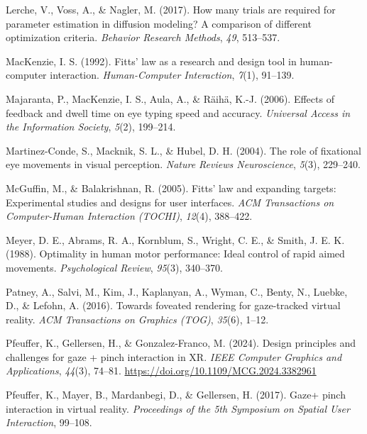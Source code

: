 \documentclass[
  11pt,
  11pt,
  letterpaper]{article}
\newlength{\cslhangindent}
\newenvironment{CSLReferences}[2] %
 {\begin{list}{}{%
  \setlength{\itemindent}{0pt}
  \setlength{\leftmargin}{0pt}
  \setlength{\parsep}{0pt}
  \ifodd #1
   \setlength{\leftmargin}{\cslhangindent}
   \setlength{\itemindent}{-1\cslhangindent}
  \fi
  \setlength{\itemsep}{#2\baselineskip}}}
 {\end{list}}
\begin{document}
\begin{CSLReferences}{1}{0}
Lerche, V., Voss, A., \& Nagler, M. (2017). How many trials are required
for parameter estimation in diffusion modeling? A comparison of
different optimization criteria. \emph{Behavior Research Methods},
\emph{49}, 513--537.

MacKenzie, I. S. (1992). Fitts' law as a research and design tool in
human-computer interaction. \emph{Human-Computer Interaction},
\emph{7}(1), 91--139.

Majaranta, P., MacKenzie, I. S., Aula, A., \& Räihä, K.-J. (2006).
Effects of feedback and dwell time on eye typing speed and accuracy.
\emph{Universal Access in the Information Society}, \emph{5}(2),
199--214.

Martinez-Conde, S., Macknik, S. L., \& Hubel, D. H. (2004). The role of
fixational eye movements in visual perception. \emph{Nature Reviews
Neuroscience}, \emph{5}(3), 229--240.

McGuffin, M., \& Balakrishnan, R. (2005). Fitts' law and expanding
targets: Experimental studies and designs for user interfaces. \emph{ACM
Transactions on Computer-Human Interaction (TOCHI)}, \emph{12}(4),
388--422.

Meyer, D. E., Abrams, R. A., Kornblum, S., Wright, C. E., \& Smith, J.
E. K. (1988). Optimality in human motor performance: Ideal control of
rapid aimed movements. \emph{Psychological Review}, \emph{95}(3),
340--370.

Patney, A., Salvi, M., Kim, J., Kaplanyan, A., Wyman, C., Benty, N.,
Luebke, D., \& Lefohn, A. (2016). Towards foveated rendering for
gaze-tracked virtual reality. \emph{ACM Transactions on Graphics (TOG)},
\emph{35}(6), 1--12.

Pfeuffer, K., Gellersen, H., \& Gonzalez-Franco, M. (2024). Design
principles and challenges for gaze + pinch interaction in XR. \emph{IEEE
Computer Graphics and Applications}, \emph{44}(3), 74--81.
\url{https://doi.org/10.1109/MCG.2024.3382961}

Pfeuffer, K., Mayer, B., Mardanbegi, D., \& Gellersen, H. (2017). Gaze+
pinch interaction in virtual reality. \emph{Proceedings of the 5th
Symposium on Spatial User Interaction}, 99--108.


\end{CSLReferences}
\end{document}
